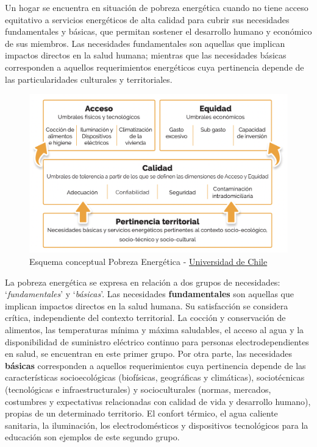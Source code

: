 \documentclass[
]{book}
\begin{document}
Un hogar se encuentra en situación de pobreza energética cuando no tiene acceso equitativo a servicios energéticos de alta calidad para cubrir sus necesidades fundamentales y básicas, que permitan sostener el desarrollo humano y económico de sus miembros. Las necesidades fundamentales son aquellas que implican impactos directos en la salud humana; mientras que las necesidades básicas corresponden a aquellos requerimientos energéticos cuya pertinencia depende de las particularidades culturales y territoriales.

\begin{figure}
\centering
\includegraphics{images/esquema_PE.png}
\caption{Esquema conceptual Pobreza Energética - \href{http://redesvid.uchile.cl/pobreza-energetica/wp-content/uploads/2020/09/Policy-Paper-Pobreza-Energe\%CC\%81tica.-El-acceso-desigual-a-energi\%CC\%81a-de-calidad-como-barrera-para-el-desarrollo-en-Chile.pdf}{Universidad de Chile}}
\end{figure}

La pobreza energética se expresa en relación a dos grupos de necesidades: `\emph{fundamentales}' y `\emph{básicas}'. Las necesidades \textbf{fundamentales} son aquellas que implican impactos directos en la salud humana. Su satisfacción se considera crítica, independiente del contexto territorial. La cocción y conservación de alimentos, las temperaturas mínima y máxima saludables, el acceso al agua y la disponibilidad de suministro eléctrico continuo para personas electrodependientes en salud, se encuentran en este primer grupo. Por otra parte, las necesidades \textbf{básicas} corresponden a aquellos requerimientos cuya pertinencia depende de las características socioecológicas (biofísicas, geográficas y climáticas), sociotécnicas (tecnológicas e infraestructurales) y socioculturales (normas, mercados, costumbres y expectativas relacionadas con calidad de vida y desarrollo humano), propias de un determinado territorio. El confort térmico, el agua caliente sanitaria, la iluminación, los electrodomésticos y dispositivos tecnológicos para la educación son ejemplos de este segundo grupo.
\end{document}
